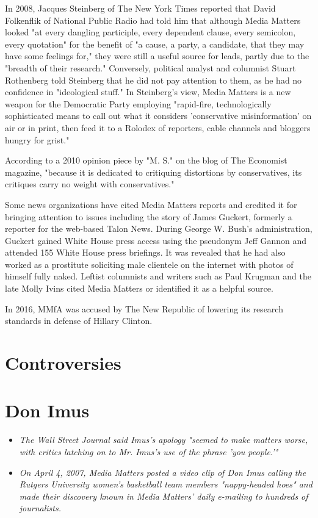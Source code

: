 In 2008, Jacques Steinberg of The New York Times reported that David
Folkenflik of National Public Radio had told him that although Media
Matters looked "at every dangling participle, every dependent clause,
every semicolon, every quotation" for the benefit of "a cause, a party,
a candidate, that they may have some feelings for," they were still a
useful source for leads, partly due to the "breadth of their research."
Conversely, political analyst and columnist Stuart Rothenberg told
Steinberg that he did not pay attention to them, as he had no confidence
in "ideological stuff." In Steinberg's view, Media Matters is a new
weapon for the Democratic Party employing "rapid-fire, technologically
sophisticated means to call out what it considers 'conservative
misinformation' on air or in print, then feed it to a Rolodex of
reporters, cable channels and bloggers hungry for grist."

According to a 2010 opinion piece by "M. S." on the blog of The
Economist magazine, "because it is dedicated to critiquing distortions
by conservatives, its critiques carry no weight with conservatives."

Some news organizations have cited Media Matters reports and credited it
for bringing attention to issues including the story of James Guckert,
formerly a reporter for the web-based Talon News. During George W.
Bush's administration, Guckert gained White House press access using the
pseudonym Jeff Gannon and attended 155 White House press briefings. It
was revealed that he had also worked as a prostitute soliciting male
clientele on the internet with photos of himself fully naked. Leftist
columnists and writers such as Paul Krugman and the late Molly Ivins
cited Media Matters or identified it as a helpful source.

In 2016, MMfA was accused by The New Republic of lowering its research
standards in defense of Hillary Clinton.

\section{Controversies}\label{controversies}

\section{Don Imus}\label{don-imus}

\begin{itemize}
\item
  \emph{The Wall Street Journal said Imus's apology "seemed to make
  matters worse, with critics latching on to Mr. Imus's use of the
  phrase 'you people.'"}
\item
  \emph{On April 4, 2007, Media Matters posted a video clip of Don Imus
  calling the Rutgers University women's basketball team members
  "nappy-headed hoes" and made their discovery known in Media Matters'
  daily e-mailing to hundreds of journalists.}
\end{itemize}

